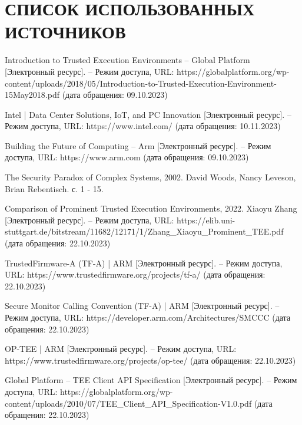 \section*{СПИСОК ИСПОЛЬЗОВАННЫХ ИСТОЧНИКОВ}

\begingroup
\renewcommand{\section}[2]{}
\begin{thebibliography}{}
Introduction to Trusted Execution Environments -- Global Platform [Электронный ресурс]. – Режим доступа, URL: https://globalplatform.org/wp-content/uploads/2018/05/Introduction-to-Trusted-Execution-Environment-15May2018.pdf (дата обращения: 09.10.2023)

Intel | Data Center Solutions, IoT, and PC Innovation [Электронный ресурс]. – Режим доступа, URL: https://www.intel.com/ (дата обращения: 10.11.2023)

Building the Future of Computing – Arm [Электронный ресурс]. – Режим доступа, URL: https://www.arm.com (дата обращения: 09.10.2023)

The Security Paradox of Complex Systems, 2002. David Woods, Nancy Leveson, Brian Rebentisch. с. 1 - 15.

Comparison of Prominent Trusted Execution Environments, 2022. Xiaoyu Zhang [Электронный ресурс]. – Режим доступа, URL: https://elib.uni-stuttgart.de/bitstream/11682/12171/1/Zhang\_Xiaoyu\_Prominent\_TEE.pdf (дата обращения: 22.10.2023)

TrustedFirmware-A (TF-A) | ARM [Электронный ресурс]. – Режим доступа, URL: https://www.trustedfirmware.org/projects/tf-a/ (дата обращения: 22.10.2023)

Secure Monitor Calling Convention (TF-A) | ARM [Электронный ресурс]. – Режим доступа, URL: https://developer.arm.com/Architectures/SMCCC (дата обращения: 22.10.2023)

OP-TEE | ARM [Электронный ресурс]. – Режим доступа, URL: https://www.trustedfirmware.org/projects/op-tee/ (дата обращения: 22.10.2023)

Global Platform -- TEE Client API Specification [Электронный ресурс]. – Режим доступа, URL: https://globalplatform.org/wp-content/uploads/2010/07/TEE\_Client\_API\_Specification-V1.0.pdf (дата обращения: 22.10.2023)


\end{thebibliography}
